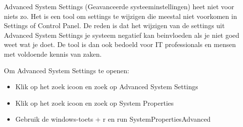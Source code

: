 Advanced System Settings (Geavanceerde systeeminstellingen) heet niet voor niets zo. Het is een tool om settings te wijzigen die meestal niet voorkomen in Settings of Control Panel. De reden is dat het wijzigen van de settings uit Advanced System Settings je systeem negatief kan beinvloeden als je niet goed weet wat je doet. De tool is dan ook bedoeld voor IT professionals en mensen met voldoende kennis van zaken.

Om Advanced System Settings te openen:
\begin{itemize}
\item Klik op het zoek icoon en zoek op Advanced System Settings
\item Klik op het zoek icoon en zoek op System Properties
\item Gebruik de windows-toets + r en run SystemPropertiesAdvanced
\end{itemize}

\begin{minipage}[t]{\linewidth}
\raggedright
{}
\end{minipage}

